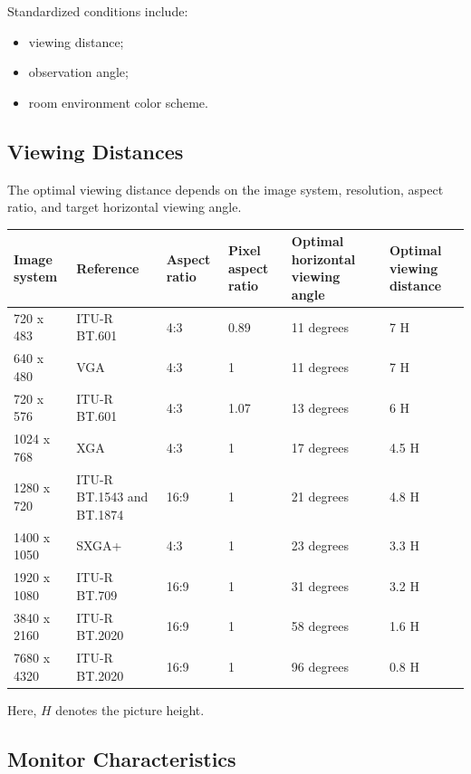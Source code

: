 Standardized conditions include:

\begin{itemize}
\item viewing distance;
\item observation angle;
\item room environment color scheme.
\end{itemize}

\subsection{Viewing Distances}

The optimal viewing distance depends on the image system, resolution, aspect ratio, and target horizontal viewing angle.

\begin{center}
\begin{tabular}{|l|l|l|l|l|l|}
\hline
\textbf{Image system} & \textbf{Reference} & \textbf{Aspect ratio} & \textbf{Pixel aspect ratio} & \textbf{Optimal horizontal viewing angle} & \textbf{Optimal viewing distance} \\ \hline
720 x 483 & ITU-R BT.601 & 4:3 & 0.89 & 11 degrees & 7 H \\ \hline
640 x 480 & VGA & 4:3 & 1 & 11 degrees & 7 H \\ \hline
720 x 576 & ITU-R BT.601 & 4:3 & 1.07 & 13 degrees & 6 H \\ \hline
1024 x 768 & XGA & 4:3 & 1 & 17 degrees & 4.5 H \\ \hline
1280 x 720 & ITU-R BT.1543 and BT.1874 & 16:9 & 1 & 21 degrees & 4.8 H \\ \hline
1400 x 1050 & SXGA+ & 4:3 & 1 & 23 degrees & 3.3 H \\ \hline
1920 x 1080 & ITU-R BT.709 & 16:9 & 1 & 31 degrees & 3.2 H \\ \hline
3840 x 2160 & ITU-R BT.2020 & 16:9 & 1 & 58 degrees & 1.6 H \\ \hline
7680 x 4320 & ITU-R BT.2020 & 16:9 & 1 & 96 degrees & 0.8 H \\ \hline
\end{tabular}
\end{center}

Here, $H$ denotes the picture height.

\subsection{Monitor Characteristics}

